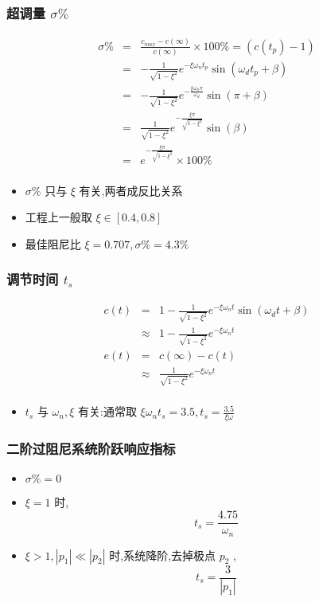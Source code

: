 \documentclass{article}
\begin{document}
\begin{frame}
\frametitle{超调量 $\sigma \%$}
\label{sec-1-3-4}

\begin{eqnarray*}
\sigma \% & = & \frac{c_{max}-c(\infty)}{c(\infty)}\times 100\% 
         = (c(t_p)-1) \\
         &=& -\frac{1}{\sqrt{1-\xi^2}}e^{-\xi\omega_n t_p}\sin(\omega_d t_p+\beta) \\
         &=& -\frac{1}{\sqrt{1-\xi^2}}e^{-\frac{\xi\omega_n\pi}{\omega_d}}\sin(\pi+\beta) \\
         &=& \frac{1}{\sqrt{1-\xi^2}}e^{-\frac{\xi\pi}{\sqrt{1-\xi^2}}}\sin(\beta) \\
         &=& e^{-\frac{\xi\pi}{\sqrt{1-\xi^2}}}\times 100\% \\
\end{eqnarray*}

\begin{itemize}
\item <2->$\sigma\%$ 只与 $\xi$ 有关,两者成反比关系
\item <3->工程上一般取 $\xi\in[0.4,0.8]$
\item <4->最佳阻尼比 $\xi=0.707,\sigma\%=4.3\%$
\end{itemize}
\end{frame}
\begin{frame}
\frametitle{调节时间 $t_s$}
\label{sec-1-3-5}



\begin{eqnarray*}
c(t) & = & 1-\frac{1}{\sqrt{1-\xi^2}}e^{-\xi\omega_n t}\sin(\omega_d t+\beta)\\
     &\approx & 1-\frac{1}{\sqrt{1-\xi^2}}e^{-\xi\omega_n t} \\
e(t) &=& c(\infty)-c(t) \\
    &\approx& \frac{1}{\sqrt{1-\xi^2}}e^{-\xi\omega_n t}\\ 
\end{eqnarray*}

\begin{itemize}
\item <2-> $t_s$ 与 $\omega_n,\xi$ 有关:通常取 $\xi\omega_n t_s = 3.5,t_s=\frac{3.5}{\xi\omega}$
\end{itemize}
       
\end{frame}
\begin{frame}
\frametitle{二阶过阻尼系统阶跃响应指标}
\label{sec-1-3-6}

\begin{itemize}
\item <2->$\sigma\%=0$
\item <3->$\xi=1$ 时, 
       	\[t_s=\frac{4.75}{\omega_n}\]
\item <4->$\xi>1,|p_1|\ll |p_2|$ 时,系统降阶,去掉极点 $p_2$ , 
       \[t_s=\frac{3}{|p_1|}\]
\end{itemize}
\end{frame}
\end{document}
